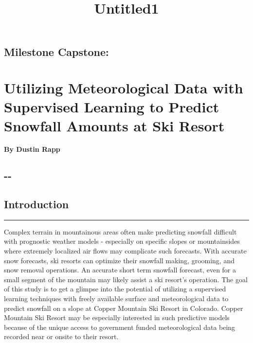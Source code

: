 \documentclass[11pt]{article}
\title{Untitled1}
\begin{document}
    
    
    \maketitle
    
    

    
    \subsection{Milestone Capstone:}\label{milestone-capstone}

\section{Utilizing Meteorological Data with Supervised Learning to
Predict Snowfall Amounts at Ski
Resort}\label{utilizing-meteorological-data-with-supervised-learning-to-predict-snowfall-amounts-at-ski-resort}

\textbf{By Dustin Rapp}

\subsection{-\/-}\label{section}

\subsection{Introduction}\label{introduction}

\begin{center}\rule{0.5\linewidth}{\linethickness}\end{center}

Complex terrain in mountainous areas often make predicting snowfall
difficult with prognostic weather models - especially on specific slopes
or mountainsides where extremely localized air flows may complicate such
forecasts. With accurate snow forecasts, ski resorts can optimize their
snowfall making, grooming, and snow removal operations. An accurate
short term snowfall forecast, even for a small segment of the mountain
may likely assist a ski resort's operation. The goal of this study is to
get a glimpse into the potential of utilizing a supervised learning
techniques with freely available surface and meteorological data to
predict snowfall on a slope at Copper Mountain Ski Resort in Colorado.
Copper Mountain Ski Resort may be especially interested in such
predictive models because of the unique access to government funded
meteorological data being recorded near or onsite to their resort.
\end{document}

